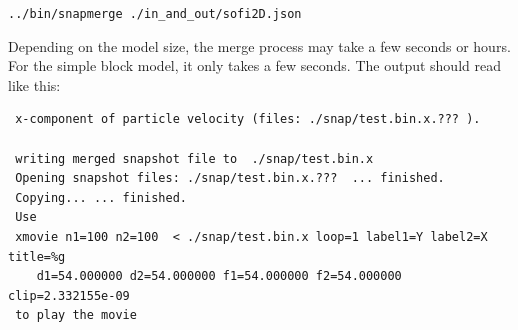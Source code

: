 \texttt{../bin/snapmerge ./in\_and\_out/sofi2D.json}

Depending on the model size, the merge process may take a few seconds or hours. For the simple block model, it only takes a few seconds. The output should read like this:

\begin{verbatim}
 x-component of particle velocity (files: ./snap/test.bin.x.??? ).

 writing merged snapshot file to  ./snap/test.bin.x
 Opening snapshot files: ./snap/test.bin.x.???  ... finished.
 Copying... ... finished.
 Use
 xmovie n1=100 n2=100  < ./snap/test.bin.x loop=1 label1=Y label2=X title=%g 
    d1=54.000000 d2=54.000000 f1=54.000000 f2=54.000000 clip=2.332155e-09
 to play the movie
\end{verbatim} 